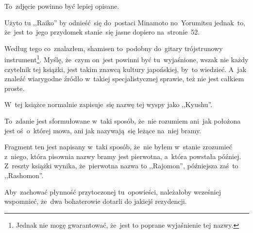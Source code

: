 \documentclass[a4paper,11pt]{article}
\begin{document}
\vspace{\spaceTwo}






\start {} To~zdjęcie powinno być lepiej opisane.

\vspace{\spaceFour}


\start {} Użyto tu ,,Raiko'' %
by odnieść~się do~postaci Minamoto no~Yorumitsu jednak~to, że~jest
to~jego przydomek stanie~się jasne dopiero na~stronie~52.

\vspace{\spaceFour}


\start {} Według tego co~znalazłem, shamisen
to~podobny do~gitary trójstrunowy instrument\footnote{Jednak nie mogę
  gwarantować, że~jest to poprane wyjaśnienie tej nazwy.}. Myślę,
że~czym on~jest powinni być tu~wyjaśnione, wszak nie każdy czytelnik
tej książki, jest takim znawcą kultury japońskiej, by~to wiedzieć.
A~jak znaleźć wiarygodne źródło w~takiej specjalistycznej sprawie, też
nie jest całkiem proste.

\vspace{\spaceFour}


\start {} W~tej książce normalnie zapisuje~się nazwę tej
wyspy jako ,,Kyushu''. %

\vspace{\spaceFour}


\start {} To~zdanie jest sformułowane w~taki sposób,
że~nie rozumiem ani~jak położona jest oś~o~której mowa, ani jak
nazywają~się leżące na~niej bramy.

\vspace{\spaceFour}


\start {} Fragment ten jest napisany w~taki sposób,
że~nie byłem w~stanie zrozumieć z~niego, która pisownia nazwy bramy
jest pierwotna, a~która powstała później. Z~reszty książki wynika,
że~pierwotna nazwa to ,,Rajomon'', %
późniejsza zaś~to ,,Rashomon''. %

\vspace{\spaceFour}


\start {} Aby~zachować płynność przytoczonej
tu~opowieści, należałoby wcześniej wspomnieć, że~dwa bohaterowie
dotarli do jakiejś rezydencji.
\end{document}
